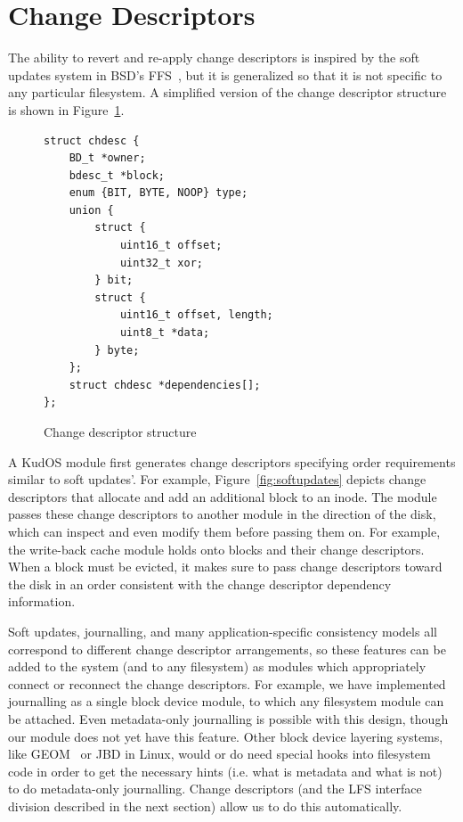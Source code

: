 \preparagraphspacing{}
\section*{Change Descriptors}
\label{sec:chdescs}

The ability to revert and re-apply change descriptors is inspired by the soft
updates system in BSD's FFS~\cite{ganger00soft}, but it is generalized so that
it is not specific to any particular filesystem. A simplified version of the
change descriptor structure is shown in Figure~\ref{fig:chdesc}.

\begin{figure}
{\footnotesize
\begin{verbatim}
struct chdesc {
    BD_t *owner;
    bdesc_t *block;
    enum {BIT, BYTE, NOOP} type;
    union {
        struct {
            uint16_t offset;
            uint32_t xor;
        } bit;
        struct {
            uint16_t offset, length;
            uint8_t *data;
        } byte;
    };
    struct chdesc *dependencies[];
};
\end{verbatim}
}
\vspace{-14pt}
\caption{\label{fig:chdesc} Change descriptor structure}
\end{figure}

A KudOS module first generates change descriptors specifying order
requirements similar to soft updates'. For example,
Figure~\ref{fig:softupdates} depicts change descriptors that allocate
and add an additional block to an inode.
%
The module passes these change descriptors to another module in the
direction of the disk, which can inspect and even modify them before
passing them on.
%
For example, the write-back cache module holds onto blocks and their
change descriptors.
%
When a block must be evicted, it makes sure to pass change descriptors
toward the disk in an order consistent with the change descriptor
dependency information.

Soft updates, journalling, and many application-specific consistency
models all correspond to different change descriptor arrangements, so
these features can be added to the system (and to any filesystem) as
modules which appropriately connect or reconnect the change
descriptors. For example, we have implemented journalling as a single
block device module, to which any filesystem module can be
attached. Even metadata-only journalling is possible with this design,
though our module does not yet have this feature.  Other block device
layering systems, like GEOM~\cite{geom} or JBD in Linux, would or do
need special hooks into filesystem code in order to get the necessary
hints (i.e. what is metadata and what is not) to do metadata-only
journalling. Change descriptors (and the LFS interface division
described in the next section) allow us to do this automatically.

